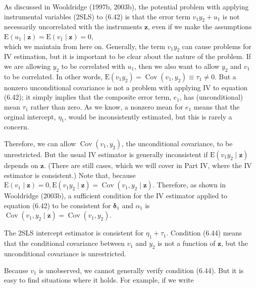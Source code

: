 \documentclass[10pt]{article}
\begin{document}
As discussed in Wooldridge (1997b, 2003b), the potential problem with applying instrumental variables (2SLS) to (6.42) is that the error term $v_{1} y_{2}+u_{1}$ is not necessarily uncorrelated with the instruments $\mathbf{z}$, even if we make the assumptions\\
$\mathrm{E}\left(u_{1} \mid \mathbf{z}\right)=\mathrm{E}\left(v_{1} \mid \mathbf{z}\right)=0$,\\
which we maintain from here on. Generally, the term $v_{1} y_{2}$ can cause problems for IV estimation, but it is important to be clear about the nature of the problem. If we are allowing $y_{2}$ to be correlated with $u_{1}$, then we also want to allow $y_{2}$ and $v_{1}$ to be correlated. In other words, $\mathrm{E}\left(v_{1} y_{2}\right)=\operatorname{Cov}\left(v_{1}, y_{2}\right) \equiv \tau_{1} \neq 0$. But a nonzero unconditional covariance is not a problem with applying IV to equation (6.42); it simply implies that the composite error term, $e_{1}$, has (unconditional) mean $\tau_{1}$ rather than zero. As we know, a nonzero mean for $e_{1}$ means that the orginal intercept, $\eta_{1}$, would be inconsistently estimated, but this is rarely a concern.

Therefore, we can allow $\operatorname{Cov}\left(v_{1}, y_{2}\right)$, the unconditional covariance, to be unrestricted. But the usual IV estimator is generally inconsistent if $\mathrm{E}\left(v_{1} y_{2} \mid \mathbf{z}\right)$ depends on $\mathbf{z}$. (There are still cases, which we will cover in Part IV, where the IV estimator is consistent.) Note that, because $\mathrm{E}\left(v_{1} \mid \mathbf{z}\right)=0, \mathrm{E}\left(v_{1} y_{2} \mid \mathbf{z}\right)=\operatorname{Cov}\left(v_{1}, y_{2} \mid \mathbf{z}\right)$. Therefore, as shown in Wooldridge (2003b), a sufficient condition for the IV estimator applied to equation (6.42) to be consistent for $\boldsymbol{\delta}_{1}$ and $\alpha_{1}$ is\\
$\operatorname{Cov}\left(v_{1}, y_{2} \mid \mathbf{z}\right)=\operatorname{Cov}\left(v_{1}, y_{2}\right)$.

The 2SLS intercept estimator is consistent for $\eta_{1}+\tau_{1}$. Condition (6.44) means that the conditional covariance between $v_{1}$ and $y_{2}$ is not a function of $\mathbf{z}$, but the unconditional covariance is unrestricted.

Because $v_{1}$ is unobserved, we cannot generally verify condition (6.44). But it is easy to find situations where it holds. For example, if we write
\end{document}
